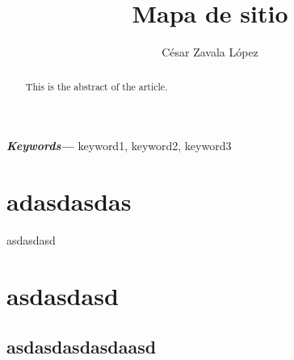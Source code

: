 \documentclass{article}
\date{}
\title{Mapa de sitio}
\author[1,*]{César Zavala López \orcidlink{0000-1111-1111-2222}}
\affil[1]{Universidad Politécnica de victoria}
\providecommand{\keywords}[1]
{
  \small  
  \textbf{\textit{Keywords---}} #1
}
\begin{document}
\maketitle
\begin{abstract}
This is the abstract of the article.
\end{abstract}
\keywords{keyword1, keyword2, keyword3}
\section{adasdasdas}
asdasdasd
\section{asdasdasd}
\subsection{asdasdasdasdaasd}
\end{document}
